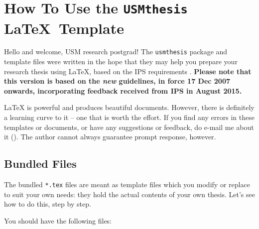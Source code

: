 \chapter{How To Use the \texttt{USMthesis} \LaTeX\ Template}
\label{chap-howtouse}

\lstset{language=[LaTeX]TeX, basicstyle=\ttfamily, columns=flexible}


Hello and welcome, \ac{USM} research postgrad!  The \verb|usmthesis| package and template files were written in the hope that they may help you prepare your research thesis using \LaTeX, based on the \ac{IPS} requirements \citep{ips:thesis:guideline:2007}. \textbf{Please note that this version is based on the \emph{new} guidelines, in force 17 Dec 2007 onwards, incorporating feedback received from IPS in August 2015.}

\LaTeX{} is powerful and produces beautiful documents.  However, there is definitely a learning curve to it -- one that is worth the effort.  %
If you find any errors in these templates or documents, or have any suggestions or feedback, do e-mail me about it ().  The author cannot always guarantee prompt response, however. \Smiley



\section{Bundled Files}
The bundled \texttt{*.tex} files are meant as template files which you modify or replace to suit your own needs: they hold the actual contents of your own thesis. Let's see how to do this, step by step.

You should have the following files:

